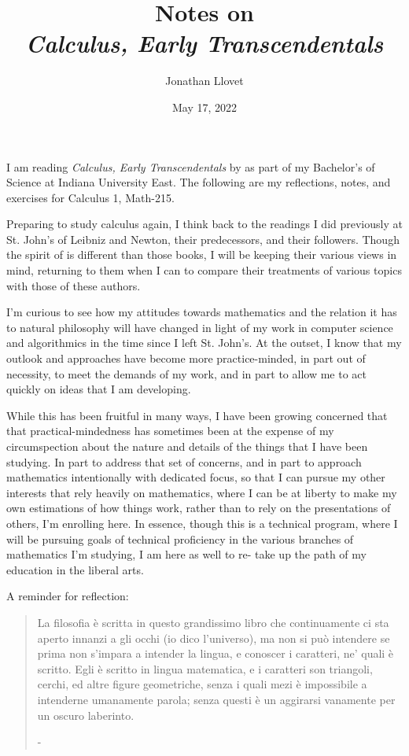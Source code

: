 \documentclass[leqno]{article}
\title{Notes on\\\textit{Calculus, Early Transcendentals}}
\author{Jonathan Llovet}
\date{May 17, 2022}
\numberwithin{equation}{section}
\begin{document}
\maketitle

I am reading \textit{Calculus, Early Transcendentals} by \citeauthor{briggsCalculusEarlyTranscendentals2019}
as part of my Bachelor's of Science at Indiana University East. The following are my reflections, notes, and
exercises for Calculus 1, Math-215.

Preparing to study calculus again,
I think back to the readings I did previously
at St. John's of Leibniz and Newton, their predecessors, and their followers.
Though the spirit of 
is different than those books, I will be keeping their various views in mind,
returning to them when I can to compare their treatments of various topics with those
of these authors.

I'm curious to see how my attitudes towards mathematics and the relation it has
to natural philosophy will have changed in light of my work in computer science
and algorithmics in the time since I left St. John's. At the outset, I know that
my outlook and approaches have become more practice-minded, in part out of necessity,
to meet the demands of my work, and in part to allow me to act quickly on ideas
that I am developing.

While this has been fruitful in many ways, I have been growing concerned that
that practical-mindedness has sometimes been at the expense of my circumspection
about the nature and details of the things that I have been studying.
In part to address that set of concerns, and in part to approach mathematics intentionally
with dedicated focus, so that I can pursue my other interests that rely heavily
on mathematics, where I can be at liberty to make my own estimations of how things work,
rather than to rely on the presentations of others, I'm enrolling here.
In essence, though this is a technical program, where I will be pursuing
goals of technical proficiency in the various branches of mathematics I'm studying,
I am here as well to re- take up the path of my education in the liberal arts.

\newpage
A reminder for reflection:

\begin{quote}
    La filosofia è scritta in questo grandissimo
    libro che continuamente ci sta aperto innanzi a gli occhi (io dico l'universo),
    ma non si può intendere se prima non s'impara a intender la lingua,
    e conoscer i caratteri, ne' quali è scritto.
    Egli è scritto in lingua matematica,
    e i caratteri son triangoli, cerchi, ed altre figure geometriche,
    senza i quali mezi è impossibile a intenderne umanamente parola;
    senza questi è un aggirarsi vanamente per un oscuro laberinto.

    - \citeauthor{galileogalileiSaggiatore}
\end{quote}

\newpage

\tableofcontents

\newpage


\printbibliography
\end{document}
